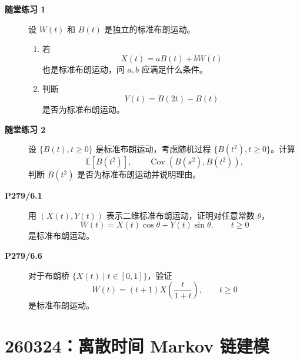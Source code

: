 \documentclass[12pt,a4paper,openany]{ctexrep}
\theoremstyle{definition}
\newcommand{\E}{\mathbb{E}}
\newcommand{\Cov}{\operatorname{Cov}}
\begin{document}
\begin{description}
	\item[\textbf{随堂练习 1}] 设 $W(t)$ 和 $B(t)$ 是独立的标准布朗运动。
	\begin{enumerate}[label=(\arabic*)]
		\item 若
		\[
		X(t)=aB(t)+bW(t)
		\]
		也是标准布朗运动，问 $a,b$ 应满足什么条件。
		\item 判断
		\[
		Y(t)=B(2t)-B(t)
		\]
		是否为标准布朗运动。
	\end{enumerate}
	\item[\textbf{随堂练习 2}] 设 $\{B(t),t\ge0\}$ 是标准布朗运动，考虑随机过程 $\{B(t^2),t\ge0\}$。计算
	\[
	\E[B(t^2)],\qquad \Cov(B(s^2),B(t^2)),
	\]
	判断 $B(t^2)$ 是否为标准布朗运动并说明理由。
	\item[\textbf{P279/6.1}] 用 $(X(t),Y(t))$ 表示二维标准布朗运动，证明对任意常数 $\theta$，
	\[
	W(t)=X(t)\cos\theta+Y(t)\sin\theta,\qquad t\ge0
	\]
	是标准布朗运动。
	\item[\textbf{P279/6.6}] 对于布朗桥 $\{X(t)\mid t\in[0,1]\}$，验证
	\[
	W(t)=(t+1)X\left(\frac{t}{1+t}\right),\qquad t\ge0
	\]
	是标准布朗运动。
\end{description}

\section{260324：离散时间 Markov 链建模}
\end{document}
